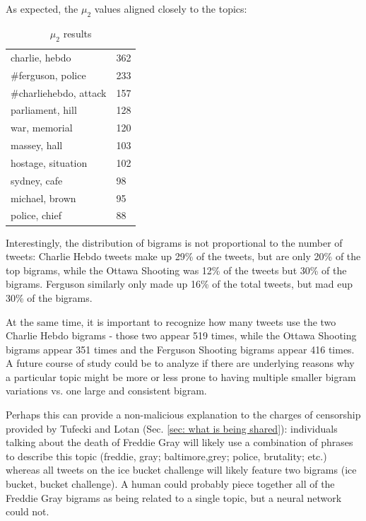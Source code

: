 \documentclass[preprint,review,12pt]{elsarticle}
\begin{document}
As expected, the $\mu_2$ values aligned closely to the topics:
\begin{table}[h]
    \centering
    \begin{tabular}{|p{4cm}|p{2cm}|}
    \hline
         charlie, hebdo & 362 \\
         $\#$ferguson, police & 233 \\
         $\#$charliehebdo, attack & 157 \\
         parliament, hill & 128 \\
         war, memorial & 120 \\
         massey, hall & 103 \\
         hostage, situation & 102 \\
         sydney, cafe & 98 \\
         michael, brown & 95 \\
         police, chief & 88 \\
    \hline
    \end{tabular}
    \caption{$\mu_2$ results}
    \label{tab:mu_2 results pheme}
\end{table}

Interestingly, the distribution of bigrams is not proportional to the number of tweets: Charlie Hebdo tweets make up 29\% of the tweets, but are only 20\% of the top bigrams, while the Ottawa Shooting was 12\% of the tweets but 30\% of the bigrams. Ferguson similarly only made up 16\% of the total tweets, but mad eup 30\% of the bigrams.

At the same time, it is important to recognize how many tweets use the two Charlie Hebdo bigrams - those two appear 519 times, while the Ottawa Shooting bigrams appear 351 times and the Ferguson Shooting bigrams appear 416 times. A future course of study could be to analyze if there are underlying reasons why a particular topic might be more or less prone to having multiple smaller bigram variations vs. one large and consistent bigram.

Perhaps this can provide a non-malicious explanation to the charges of censorship provided by Tufecki and Lotan (Sec. \ref{sec: what is being shared}): individuals talking about the death of Freddie Gray will likely use a combination of phrases to describe this topic (freddie, gray; baltimore,grey; police, brutality; etc.) whereas all tweets on the ice bucket challenge will likely feature two bigrams (ice bucket, bucket challenge). A human could probably piece together all of the Freddie Gray bigrams as being related to a single topic, but a neural network could not.
\end{document}
